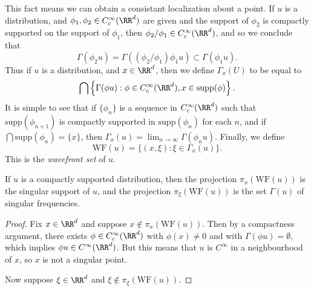 This fact means we can obtain a consistant localization about a point. If $u$ is a distribution, and $\phi_1,\phi_2 \in C_c^\infty(\RR^d)$ are given and the support of $\phi_2$ is compactly supported on the support of $\phi_1$, then $\phi_2/\phi_1 \in C_c^\infty(\RR^d)$, and so we conclude that
%
\[ \Gamma(\phi_2 u) = \Gamma((\phi_2/\phi_1) \phi_1 u) \subset \Gamma(\phi_1 u). \]
%
Thus if $u$ is a distribution, and $x \in \RR^d$, then we define $\Gamma_x(U)$ to be equal to
%
\[ \bigcap \left\{ \Gamma(\phi u) : \phi \in C_c^\infty(\RR^d), x \in \text{supp}(\phi) \right\}. \]
%
It is simple to see that if $\{ \phi_n \}$ is a sequence in $C_c^\infty(\RR^d)$ such that $\text{supp}(\phi_{n+1})$ is compactly supported in $\text{supp}(\phi_n)$ for each $n$, and if $\bigcap \text{supp}(\phi_n) = \{ x \}$, then $\Gamma_x(u) = \lim_{n \to \infty} \Gamma(\phi_n u)$. Finally, we define
%
\[ \text{WF}(u) = \{ (x,\xi): \xi \in \Gamma_x(u) \}. \]
%
This is the \emph{wavefront set} of $u$.

\begin{lemma}
  If $u$ is a compactly supported distribution, then the projection $\pi_x(\text{WF}(u))$ is the singular support of $u$, and the projection $\pi_\xi(\text{WF}(u))$ is the set $\Gamma(u)$ of singular frequencies.
\end{lemma}
\begin{proof}
  Fix $x \in \RR^d$ and suppose $x \not \in \pi_x(\text{WF}(u))$. Then by a compactness argument, there exists $\phi \in C_c^\infty(\RR^d)$ with $\phi(x) \neq 0$ and with $\Gamma(\phi u) = \emptyset$, which implies $\phi u \in C^\infty(\RR^d)$. But this means that $u$ is $C^\infty$ in a neighbourhood of $x$, so $x$ is not a singular point.

  Now suppose $\xi \in \RR^d$ and $\xi \not \in \pi_\xi(\text{WF}(u))$.
\end{proof}

